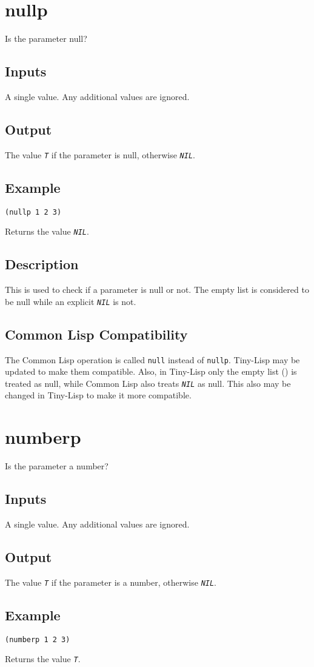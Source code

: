 \documentclass[10pt, openany]{book}
\newcommand{\constant}[1]{\emph{\texttt{#1}}}
\newcommand{\keyword}[1]{\texttt{#1}}
\newcommand{\tl}{Tiny-Lisp}
\newcommand{\cl}{Common Lisp}
\begin{document}
\section{nullp}
Is the parameter null?
\subsection{Inputs}
A single value.  Any additional values are ignored.
\subsection{Output}
The value \constant{T} if the parameter is null, otherwise \constant{NIL}.
\subsection{Example}
\begin{lstlisting}
(nullp 1 2 3)
\end{lstlisting}
Returns the value \constant{NIL}.
\subsection{Description}
This is used to check if a parameter is null or not.  The empty list is considered to be null while an explicit \constant{NIL} is not.
\subsection{Common Lisp Compatibility}
The \cl{} operation is called \keyword{null} instead of \keyword{nullp}.  \tl{} may be updated to make them compatible.  Also, in \tl{} only the empty list () is treated as null, while \cl{} also treats \constant{NIL} as null.  This also may be changed in \tl{} to make it more compatible.

\section{numberp}
Is the parameter a number?
\subsection{Inputs}
A single value.  Any additional values are ignored.
\subsection{Output}
The value \constant{T} if the parameter is a number, otherwise \constant{NIL}.
\subsection{Example}
\begin{lstlisting}
(numberp 1 2 3)
\end{lstlisting}
Returns the value \constant{T}.
\end{document}
